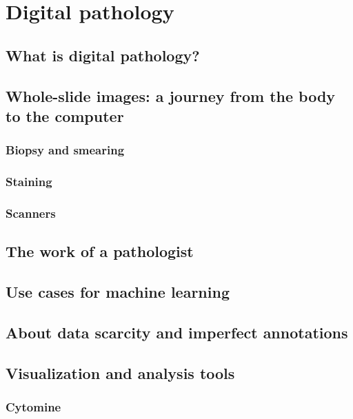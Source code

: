 \chapter{Digital pathology}
\label{chap:backdp}


\section{What is digital pathology?}

\section{Whole-slide images: a journey from the body to the computer}

\subsection{Biopsy and smearing}
\subsection{Staining}
\subsection{Scanners}

\section{The work of a pathologist}

\section{Use cases for machine learning}

\section{About data scarcity and imperfect annotations}

\parencite{van2019strategies}

\section{Visualization and analysis tools}

\subsection{Cytomine}

